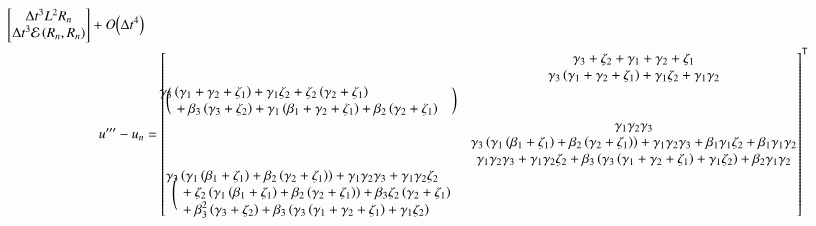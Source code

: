 \documentclass[letterpaper,11pt]{amsart}
\newcommand{\trans}[1]{{#1}^{\ensuremath{\mathsf{T}}}}
\newcommand{\order}[2]{\ensuremath{O\!\left( {#1}^{#2} \right)}}
\begin{document}
\begin{align}
\begin{bmatrix}
  \Delta{}t^{3} L^{2} R_{n} \\
  \Delta{}t^{3} \mathcal{E}\left( R_{n}, R_{n} \right)
\end{bmatrix}
  + \order{\Delta{}t}{4}
\\
  u''' - u_{n}
  &=
\trans{\begin{bmatrix}
  &\gamma_{3} + \zeta_{2}
  + \gamma_{1} + \gamma_{2} + \zeta_{1} \\
  &\gamma_{3} \left( \gamma_{1} + \gamma_{2} + \zeta_{1} \right)
  + \gamma_{1} \zeta_{2} + \gamma_{1} \gamma_{2} \\
%
\bigg(\mspace{-18mu}
\begin{split}
  &\gamma_{3} \left( \gamma_{1} + \gamma_{2} + \zeta_{1} \right)
  + \gamma_{1} \zeta_{2}
  + \zeta_{2} \left( \gamma_{2} + \zeta_{1} \right)
  \\
  &\quad+ \beta_{3} \left( \gamma_{3} + \zeta_{2} \right)
  + \gamma_{1} \left( \beta_{1} + \gamma_{2} + \zeta_{1} \right)
  + \beta_{2} \left( \gamma_{2} + \zeta_{1} \right)
\end{split}
\mspace{18mu}\bigg)
  \\
%
  &\gamma_{1} \gamma_{2} \gamma_{3} \\
  &\gamma_{3} \left(
      \gamma_{1} \left(  \beta_{1} + \zeta_{1} \right)
      + \beta_{2} \left( \gamma_{2} + \zeta_{1} \right)
    \right)
  + \gamma_{1} \gamma_{2} \gamma_{3}
  + \beta_{1} \gamma_{1} \zeta_{2}
  + \beta_{1} \gamma_{1} \gamma_{2} \\
  &\gamma_{1} \gamma_{2} \gamma_{3}
  + \gamma_{1} \gamma_{2} \zeta_{2}
  + \beta_{3} \left(
      \gamma_{3} \left( \gamma_{1} + \gamma_{2} + \zeta_{1} \right)
    + \gamma_{1} \zeta_{2}
    \right)
  + \beta_{2} \gamma_{1} \gamma_{2} \\
%
\Bigg(\mspace{-18mu}
\begin{split}
  &\gamma_{3} \left(
      \gamma_{1} \left(  \beta_{1} + \zeta_{1} \right)
      + \beta_{2} \left( \gamma_{2} + \zeta_{1} \right)
    \right)
  + \gamma_{1} \gamma_{2} \gamma_{3}
  + \gamma_{1} \gamma_{2} \zeta_{2}
  \\
  &\quad+ \zeta_{2} \left(
        \gamma_{1} \left( \beta_{1} + \zeta_{1} \right)
      + \beta_{2} \left( \gamma_{2} + \zeta_{1} \right)
    \right)
  + \beta_{3} \zeta_{2} \left( \gamma_{2} + \zeta_{1} \right)
  \\
  &\quad+ \beta_{3}^{2} \left( \gamma_{3} + \zeta_{2} \right)
  + \beta_{3} \left(
      \gamma_{3} \left( \gamma_{1} + \gamma_{2} + \zeta_{1} \right)
    + \gamma_{1} \zeta_{2}
    \right)
  \\

\end{split}
\end{bmatrix}}
\end{align}
\end{document}

